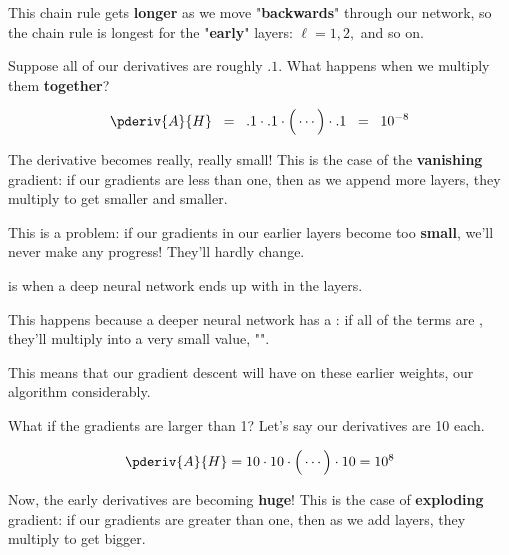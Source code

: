         This chain rule gets \textbf{longer} as we move "\textbf{backwards}" through our network, so the chain rule is longest for the "\textbf{early}" layers: $\ell=1, 2,$ and so on.
        
        Suppose all of our derivatives are roughly $.1$. What happens when we multiply them \textbf{together}?
        
        \begin{equation}
            \pderiv{A}{H}
            \;\; = \;\;
            .1 \cdot .1 \cdot 
            \Big(
            \cdots
            \Big)
            \cdot 
            .1
            \;\; = \;\;
            10^{-8}
        \end{equation}
        
        The derivative becomes really, really small! This is the case of the \textbf{vanishing} gradient: if our gradients are less than one, then as we append more layers, they multiply to get smaller and smaller.
        
        This is a problem: if our gradients in our earlier layers become too \textbf{small}, we'll never make any progress! They'll hardly change.\\
        
        \begin{definition}
             is when a deep neural network ends up with  in the  layers. 
            
            This happens because a deeper neural network has a : if all of the terms are , they'll multiply into a very small value, "".
            
            This means that our gradient descent will have  on these earlier weights,  our algorithm considerably.
        \end{definition}
        
        What if the gradients are larger than 1? Let's say our derivatives are 10 each.
        
        \begin{equation}
            \pderiv{A}{H}
            = 
            10 \cdot 10 \cdot 
            \Big(
            \cdots
            \Big)
            \cdot 
            10
            =
            10^{8}
        \end{equation}
        
        Now, the early derivatives are becoming \textbf{huge}! This is the case of \textbf{exploding} gradient: if our gradients are greater than one, then as we add layers, they multiply to get bigger.
        
